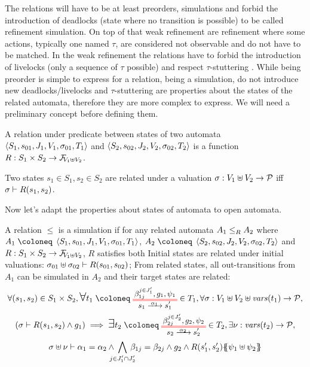 \documentclass{article}
\begin{document}
The relations will have to be at least preorders, simulations and forbid the introduction of deadlocks (state where no transition is possible) to be called refinement simulation.
On top of that weak refinement are refinement where some actions, typically one named \(\tau\), are considered not observable and do not have to be matched.
In the weak refinement the relations have to forbid the introduction of livelocks (only a sequence of \(\tau\) possible) and respect \(\tau\)-stuttering .
While being preorder is simple to express for a relation, being a simulation, do not introduce new deadlocks/livelocks and \(\tau\)-stuttering are properties about the states of the related automata, therefore they are more complex to express.
We will need a preliminary concept before defining them.
\begin{defi}
A relation under predicate between states of two automata \(\OA{S_1}{s_{01}}{J_1}{V_1}{\sigma_{01}}{T_1}\) and \(\OA{S_2}{s_{02}}{J_2}{V_2}{\sigma_{02}}{T_2}\) is a function \(R: S_1 \times S_2 \to \rformulae[V_1 \uplus V_2]\).

Two states \(s_1 \in S_1, s_2 \in S_2\) are related under a valuation \(\sigma: V_1 \uplus V_2 \to \values\) iff \(\sigma \vdash R\mpar{s_1, s_2}\).
\end{defi}
Now let's adapt the properties about states of automata to open automata.
\begin{defi}
A relation \(\leq\) is a simulation if for any related automata \(\wrel{A_1}{A_2}{R}\) where \(A_1 \defobject \OA{S_1}{s_{01}}{J_1}{V_1}{\sigma_{01}}{T_1}\), \(A_2 \defobject \OA{S_2}{s_{02}}{J_2}{V_2}{\sigma_{02}}{T_2}\) and \(R: S_1 \times S_2 \to \rformulae[V_1 \uplus V_2]\), \(R\) satisfies both
 Initial states are related under initial valuations: \(\sigma_{01} \uplus \sigma_{02} \vdash R\mpar{s_{01}, s_{02}}\);
 From related states, all out-transitions from \(A_1\) can be simulated in \(A_2\) and their target states are related:
\begin{multline*}
	\forall \mpar{s_1, s_2} \in S_1 \times S_2, \bigsymb{\forall} t_1 \defobject \OTx{1}{}{1}{1} \in T_1, \forall \sigma: V_1 \uplus V_2 \uplus \fvars{t_1} \to \values, \\
	\mpar{\sigma \vdash R\mpar{s_1, s_2} \wedge g_1} \implies \bigsymb{\exists} t_2 \defobject \OTx{2}{}{2}{2} \in T_2, \exists \nu: \fvars{t_2} \to \values, \\
	\sigma \uplus \nu \vdash \alpha_1 = \alpha_2 \wedge \bigwedge_\subbox{j \in J'_1 \cap J'_2} \beta_{1j} = \beta_{2j} \wedge g_2 \wedge R\mpar{s'_1, s'_2}\psubst{\psi_1 \uplus \psi_2}
\end{multline*}
\end{defi}
\end{document}
